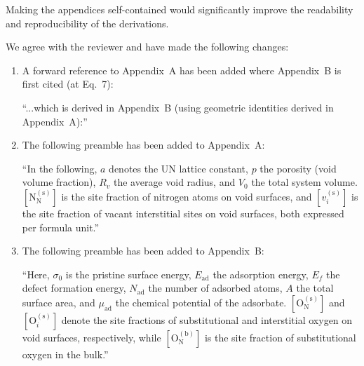 \documentclass[12pt]{article}
\begin{document}
Making the appendices self-contained would significantly improve the readability and reproducibility of the derivations.\\
\color{black}

We agree with the reviewer and have made the following changes:

\begin{enumerate}[label=(\arabic*)]
    \item A forward reference to Appendix~A has been added where Appendix~B is first cited (at Eq.~7):

    \color{red} ``...which is derived in Appendix~B (using geometric identities derived in Appendix~A):'' \color{black}

    \item The following preamble has been added to Appendix~A:

    \color{red} ``In the following, $a$ denotes the UN lattice constant, $p$ the porosity (void volume fraction), $R_v$ the average void radius, and $V_0$ the total system volume. $[\text{N}_\text{N}^{(\text{s})}]$ is the site fraction of nitrogen atoms on void surfaces, and $[v_i^{(\text{s})}]$ is the site fraction of vacant interstitial sites on void surfaces, both expressed per formula unit.'' \color{black}

    \item The following preamble has been added to Appendix~B:

    \color{red} ``Here, $\sigma_0$ is the pristine surface energy, $E_\text{ad}$ the adsorption energy, $E_f$ the defect formation energy, $N_\text{ad}$ the number of adsorbed atoms, $A$ the total surface area, and $\mu_\text{ad}$ the chemical potential of the adsorbate. $[\text{O}_\text{N}^{(\text{s})}]$ and $[\text{O}_i^{(\text{s})}]$ denote the site fractions of substitutional and interstitial oxygen on void surfaces, respectively, while $[\text{O}_\text{N}^{(\text{b})}]$ is the site fraction of substitutional oxygen in the bulk.'' \color{black}
\end{enumerate}



\end{document}
